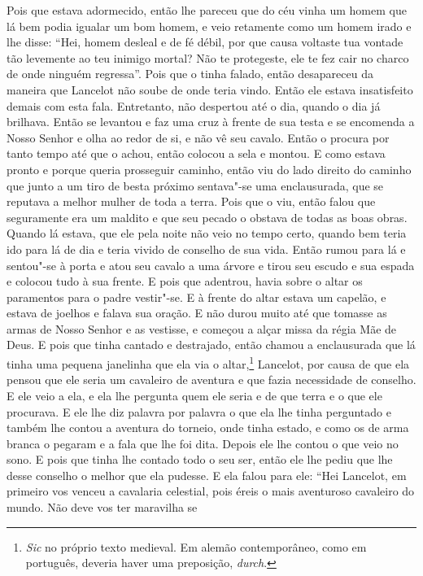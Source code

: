 Pois que estava adormecido, então lhe pareceu que do céu vinha um homem que lá
bem podia igualar um bom homem, e veio retamente como um homem irado e lhe
disse: “Hei, homem desleal e de fé débil, por que causa voltaste tua vontade
tão levemente ao teu inimigo mortal? Não te protegeste, ele te fez cair no
charco de onde ninguém regressa”. Pois que o tinha falado, então desapareceu da
maneira que Lancelot não soube de onde teria vindo. Então ele estava
insatisfeito demais com esta fala. Entretanto, não despertou até o dia, quando
o dia já brilhava. Então se levantou e faz uma cruz à frente de sua testa e se
encomenda a Nosso Senhor e olha ao redor de si, e não vê seu cavalo. Então o
procura por tanto tempo até que o achou, então colocou a sela e montou. E como
estava pronto e porque queria prosseguir caminho, então viu do lado direito do
caminho que junto a um tiro de besta próximo sentava"-se uma enclausurada, que
se reputava a melhor mulher de toda a terra. Pois que o viu, então falou que
seguramente era um maldito e que seu pecado o obstava de todas as boas obras.
Quando lá estava, que ele pela noite não veio no tempo certo, quando bem teria
ido para lá de dia e teria vivido de conselho de sua vida. Então rumou para lá
e sentou"-se à porta e atou seu cavalo a uma árvore e tirou seu escudo e sua
espada e colocou tudo à sua frente. E pois que adentrou, havia sobre o altar os
paramentos para o padre vestir"-se. E à frente do altar estava um capelão, e
estava de joelhos e falava sua oração. E não durou muito até que tomasse as
armas de Nosso Senhor e as vestisse, e começou a alçar missa da régia Mãe de
Deus. E pois que tinha cantado e destrajado, então chamou a enclausurada que lá
tinha uma pequena janelinha que ela via o altar,\footnote{ \textit{Sic} no próprio texto
medieval. Em alemão contemporâneo, como em português, deveria haver uma
preposição, \textit{durch}.}  Lancelot, por
causa de que ela pensou que ele seria um cavaleiro de aventura e que fazia
necessidade de conselho. E ele veio a ela, e ela lhe pergunta quem ele seria e
de que terra e o que ele procurava. E ele lhe diz palavra por palavra o que ela
lhe tinha perguntado e também lhe contou a aventura do torneio, onde tinha
estado, e como os de arma branca o pegaram e a fala que lhe foi dita. Depois
ele lhe contou o que veio no sono. E pois que tinha lhe contado todo o seu ser,
então ele lhe pediu que lhe desse conselho o melhor que ela pudesse. E ela
falou para ele: “Hei Lancelot, em primeiro vos venceu a cavalaria celestial,
pois éreis o mais aventuroso cavaleiro do mundo. Não deve vos ter maravilha se
